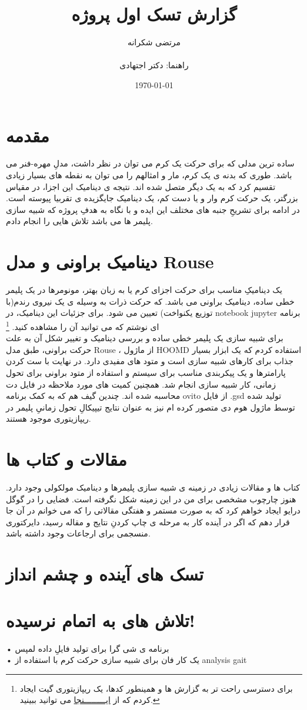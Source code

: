 \documentclass{article}
\author{مرتضی شکرانه \\ \\ راهنما: دکتر اجتهادی}
\title{گزارش تسک اول پروژه}
\date{\today}
\begin{document}
\maketitle	
\section{مقدمه} 
ساده ترین مدلی که برای حرکت یک کرم می توان در نظر داشت، مدلِ مهره-فنر می باشد. طوری که بدنه ی یک کرم، مار و امثالهم را می توان به نقطه های بسیار زیادی تقسیم کرد که به یک دیگر متصل شده اند. نتیجه ی دینامیک این اجزا، در مقیاس بزرگتر، یک حرکت کرم وار و یا دست کم، یک دینامیک جایگزیده ی تقربیا پیوسته است. 
در ادامه برای تشریحِ جنبه های مختلف این ایده و با نگاه به هدفِ پروژه که شبیه سازی پلیمر ها می باشد تلاش هایی را انجام دادم.     
\section{دینامیک براونی و مدل Rouse} 
یک دینامیکِ مناسب برای حرکت اجزای کرم یا به زبان بهتر، مونومرها در یک پلیمر خطی ساده، دینامیک براونی می باشد. که حرکت ذرات به وسیله ی یک نیروی رندم(با توزیع یکنواخت) تعیین می شود. برای جزئیات این دینامیک، در notebook jupyter برنامه ای نوشتم که می توانید آن را مشاهده کنید.
\footnote{برای دسترسی راحت تر به گزارش ها و همینطور کدها، یک ریپازیتوری گیت ایجاد کردم که از \href{https://github.com/morteza-shokraneh/My-MD}{ایـــــــــنجا} می توانید ببینید.}
\\برای شبیه سازی یک پلیمر خطی ساده و بررسی دینامیک و تغییر شکل آن به علت حرکت براونی، طبق مدل Rouse ، از ماژول HOOMD استفاده کردم که یک ابزار بسیار جذاب برای کارهای شبیه سازی است و متود های مفیدی دارد. در نهایت با ست کردن پارامترها و یک پیکربندی مناسب برای سیستم و استفاده از متود براونی برای تحول زمانی، کار شبیه سازی انجام شد. همچنین کمیت های مورد ملاحظه در فایل دت محاسبه شده اند. چندین گیف هم که به کمک برنامه ovito از فایل .gsd تولید شده توسط ماژول هوم دی متصور کرده ام نیز به عنوان نتایج تیپیکالِ تحول زمانیِ پلیمر در ریپازیتوری موجود هستند.   
\section{مقالات و کتاب ها} 
کتاب ها و مقالات زیادی در زمینه ی شبیه سازی پلیمرها و دینامیک مولکولی وجود دارد.
هنوز چارچوب مشخصی برای من در این زمینه شکل نگرفته است. فضایی را در گوگل درایو ایجاد خواهم کرد که به صورت مستمر و هفتگی مقالاتی را که می خوانم در آن جا قرار دهم که اگر در آینده کار به مرحله ی چاپ کردنِ نتایج و مقاله رسید، دایرکتوری منسجمی برای ارجاعات وجود داشته باشد.  
\section{تسک های آینده و چشم انداز} 
\section{تلاش های به اتمام نرسیده!}
• برنامه ی شی گرا برای تولید فایلِ داده لمپس \\
• یک کار فان برای شبیه سازی حرکت کرم با استفاده از analysis gait
\\
\end{document}
